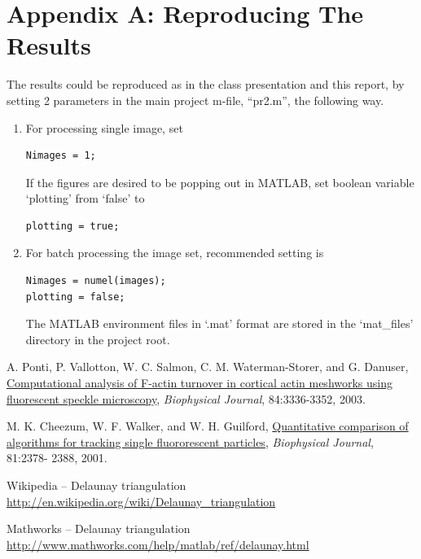 \documentclass{article}
\begin{document}
\pagebreak
\section*{Appendix A: Reproducing The Results}
 
The results could be reproduced as in the class presentation and this report, by setting 2 parameters in the main project m-file, ``pr2.m'', the following way.
\begin{enumerate}
\item For processing single image, set
\begin{verbatim}
Nimages = 1;
\end{verbatim}
If the figures are desired to be popping out in MATLAB, set boolean variable `plotting' from `false' to
\begin{verbatim}
plotting = true;
\end{verbatim}
\item For batch processing the image set, recommended setting is
\begin{verbatim}
Nimages = numel(images);
plotting = false;
\end{verbatim}
The MATLAB environment files in `.mat' format are stored in the `mat\_files' directory in the project root.
\end{enumerate}
 


\pagebreak
\begin{thebibliography}{9}
\fontsize{10pt}{12pt}\selectfont
\raggedright

        A. Ponti, P. Vallotton, W. C. Salmon, C. M. Waterman-Storer, and G.
        Danuser, \ul{Computational analysis of F-actin turnover in cortical
        actin meshworks using fluorescent speckle microscopy}, {\em Biophysical
        Journal}, 84:3336-3352, 2003.

        M. K. Cheezum, W. F. Walker, and W. H. Guilford, 
        \ul{Quantitative comparison of algorithms for tracking single 
        fluororescent particles}, {\em Biophysical Journal}, 81:2378- 2388, 2001.

        Wikipedia -- Delaunay triangulation
        \url{http://en.wikipedia.org/wiki/Delaunay_triangulation}
    
        Mathworks -- Delaunay triangulation
        \url{http://www.mathworks.com/help/matlab/ref/delaunay.html}

\end{thebibliography}


\end{document}
